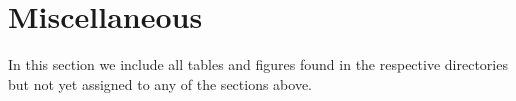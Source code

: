 \section{Miscellaneous}

In this section we include all tables and figures
found in the respective directories but not yet assigned to any of the sections above.


